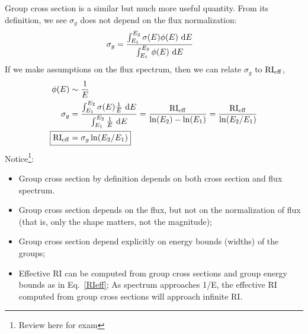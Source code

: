 \documentclass{school-22.211-notes}
\begin{document}
Group cross section is a similar but much more useful quantity. From its definition, we see $\sigma_g$ does not depend on the flux normalization: 
\begin{align}
\sigma_g &= \frac{\int_{E_1}^{E_2} \sigma(E) \phi(E) \mbox{ }\mathrm{d} E }{\int_{E_1}^{E_2} \phi(E) \mbox{ }\mathrm{d} E} 
\end{align}
If we make assumptions on the flux spectrum, then we can relate $\sigma_g$ to $\mathrm{RI}_{\mathrm{eff}}$,
\begin{align}
\phi(E) &\sim \frac{1}{E} \\
\sigma_g &= \frac{\int_{E_1}^{E_2} \sigma(E) \frac{1}{E} \dE }{\int_{E_1}^{E_2} \frac{1}{E} \dE} 
= \frac{\RI_{\eff}}{\ln(E_2) - \ln(E_1)}  
= \frac{\RI_{\eff}}{\ln(E_2/E_1)} \\
\Aboxed{\RI_{\eff} &= \sigma_g \ln(E_2/E_1) } \label{RIeff}
\end{align}
Notice\footnote{Review here for exam}:
\begin{itemize}
\item Group cross section by definition depends on both cross section and flux spectrum. 
\item Group cross section depends on the flux, but not on the normalization of flux (that is, only the shape matters, not the magnitude);
\item Group cross section depend explicitly on energy bounds (widths) of the groups; 
\item Effective RI can be computed from group cross sections and group energy bounds as in Eq.~\ref{RIeff}; As spectrum approaches 1/E, the effective RI computed from group cross sections will approach infinite RI. 
\end{itemize}
\end{document}
